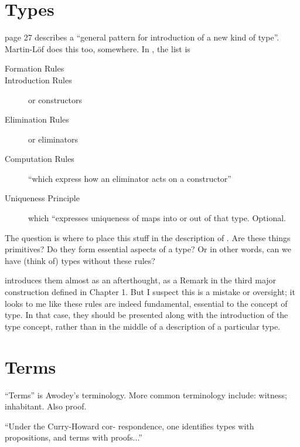 \section{Types}
\label{sect:type}

\HoTTB page 27 describes a ``general pattern for introduction of a new
kind of type''.  Martin-L\"{o}f does this too, somewhere.  In \HoTTB,
the list is

\begin{description}
\item [Formation Rules]
\item [Introduction Rules]  or constructors
\item [Elimination Rules] or eliminators
\item [Computation Rules]  ``which express how an eliminator acts on a constructor''
\item [Uniqueness Principle] which ``expresses uniqueness of maps into
  or out of that type.  Optional.
\end{description}


The question is where to place this stuff in the description of \HoTT.
Are these things primitives?  Do they form essential aspects of a
type?  Or in other words, can we have (think of) types without these rules?

\HoTTB introduces them almost as an afterthought, as a Remark in the
third major construction defined in Chapter 1.  But I suspect this is
a mistake or oversight; it looks to me like these rules are indeed
fundamental, essential to the concept of type.  In that case, they
should be presented along with the introduction of the type concept,
rather than in the middle of a description of a particular type.

\section{Terms}
\label{sect:terms}

\begin{ednote}
  ``Terms'' is Awodey's terminology.  More common terminology include:
  witness; inhabitant.  Also proof.
\end{ednote}

``Under the Curry-Howard cor- respondence, one identifies types
with propositions, and terms with proofs...''\cite{awodey_tth}
